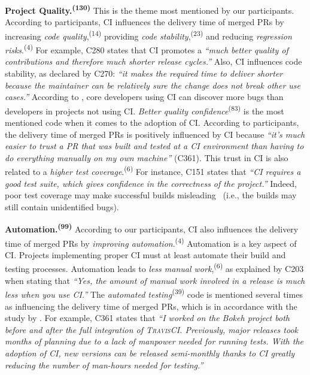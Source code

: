 \vspace{0.6mm}
\noindent\textbf{Project Quality.\textsuperscript{(130)}} This is the theme most mentioned by our participants. According to participants, CI influences the delivery time of merged PRs by increasing \textit{code quality},\textsuperscript{(14)} providing \textit{code stability},\textsuperscript{(23)} and reducing \textit{regression risks}.\textsuperscript{(4)} For example, C280 states that CI promotes a \textit{``much better quality of contributions and therefore much shorter release cycles.''} Also, CI influences code stability, as declared by C270: \textit{``it makes the required time to deliver shorter because the maintainer can be relatively sure the change does not break other use cases.''} 
According to \cite{Vasilescu2015-tn}, core developers using CI can discover more bugs than developers in projects not using CI. \textit{Better quality confidence}\textsuperscript{(83)} is the most mentioned code when it comes to the adoption of CI. According to participants, the delivery time of merged PRs is positively influenced by CI because 
\textit{``it's much easier to trust a PR that was built and tested at a CI environment than having to do everything manually on my own machine''} (C361). This trust in CI is also related to a \textit{higher test coverage}.\textsuperscript{(6)} For instance, C151 states that
\textit{``CI requires a good test suite, which gives confidence in the correctness of the project.''} Indeed, poor test coverage may make successful builds misleading~\citep{felidre2019continuous} (i.e., the builds may still contain unidentified bugs). 

\vspace{06.mm}
\noindent\textbf{Automation.\textsuperscript{(99)}} 
According to our participants, CI also influences the delivery time of merged PRs by \textit{improving automation}.\textsuperscript{(4)} Automation is a key aspect of CI. Projects implementing proper CI must at least automate their build and testing processes. Automation leads to \textit{less manual work},\textsuperscript{(6)} as explained by C203 when stating that \textit{``Yes, the amount of manual work involved in a release is much less when you use CI.''}	
The \textit{automated testing}\textsuperscript{(39)} code is mentioned several times as influencing the delivery time of merged PRs, which is in accordance with the study by \cite{rahman2015synthesizing}.
For example, C361 states that \textit{``I worked on the Bokeh project both before and after the full integration of \textsc{TravisCI}. Previously, major releases took months of planning due to a lack of manpower needed for running tests. With the adoption of CI, new versions can be released semi-monthly thanks to CI greatly reducing the number of man-hours needed for testing.''} 

